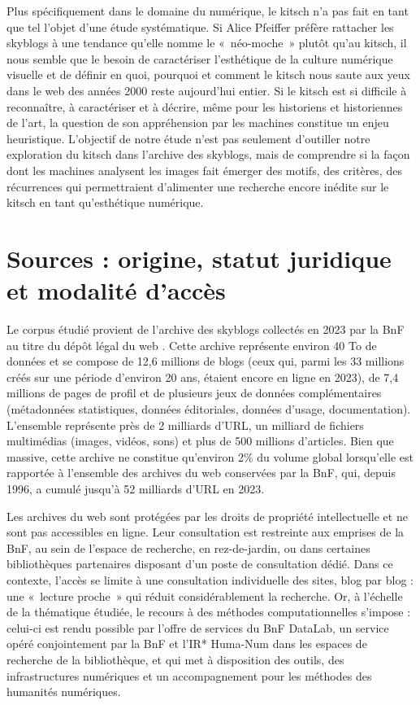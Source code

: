 \documentclass[final, fra]{anthology-ch}     %
\begin{document}
Plus spécifiquement dans le domaine du numérique, le kitsch n’a pas fait en tant que tel l’objet d’une étude systématique. Si Alice Pfeiffer \cite{PFEIFFERgoutmoche2021} préfère rattacher les skyblogs à une tendance qu’elle nomme le «~néo-moche~» plutôt qu’au kitsch, il nous semble que le besoin de caractériser l’esthétique de la culture numérique visuelle et de définir en quoi, pourquoi et comment le kitsch nous saute aux yeux dans le web des années 2000 reste aujourd’hui entier. Si le kitsch est si difficile à reconnaître, à caractériser et à décrire, même pour les historiens et historiennes de l’art, la question de son appréhension par les machines constitue un enjeu heuristique. L’objectif de notre étude n’est pas seulement d’outiller notre exploration du kitsch dans l’archive des skyblogs, mais de comprendre si la façon dont les machines analysent les images fait émerger des motifs, des critères, des récurrences qui permettraient d’alimenter une recherche encore inédite sur le kitsch en tant qu’esthétique numérique. 


\section{Sources : origine, statut juridique et modalité d'accès}
Le corpus étudié provient de l’archive des skyblogs collectés en 2023 par la BnF au titre du dépôt légal du web \cite{TYBINskyblogsauservice2024}. Cette archive représente environ 40 To de données et se compose de 12,6 millions de blogs (ceux qui, parmi les 33 millions créés sur une période d’environ 20 ans, étaient encore en ligne en 2023), de 7,4 millions de pages de profil et de plusieurs jeux de données complémentaires (métadonnées statistiques, données éditoriales, données d’usage, documentation). L’ensemble représente près de 2 milliards d’URL, un milliard de fichiers multimédias (images, vidéos, sons) et plus de 500 millions d'articles. Bien que massive, cette archive ne constitue qu’environ 2\% du volume global lorsqu’elle est rapportée à l’ensemble des archives du web conservées par la BnF, qui, depuis 1996, a cumulé jusqu'à 52 milliards d’URL en 2023.

Les archives du web sont protégées par les droits de propriété intellectuelle et ne sont pas accessibles en ligne. Leur consultation est restreinte aux emprises de la BnF, au sein de l’espace de recherche, en rez-de-jardin, ou dans certaines bibliothèques partenaires disposant d’un poste de consultation dédié. Dans ce contexte, l’accès se limite à une consultation individuelle des sites, blog par blog : une  «~lecture proche~» qui réduit considérablement la recherche. Or, à l’échelle de la thématique étudiée, le recours à des méthodes computationnelles s’impose : celui-ci est rendu possible par l’offre de services du BnF DataLab, un service opéré conjointement par la BnF et l’IR* Huma-Num dans les espaces de recherche de la bibliothèque, et qui met à disposition des outils, des infrastructures numériques et un accompagnement pour les méthodes des humanités numériques.
\end{document}

